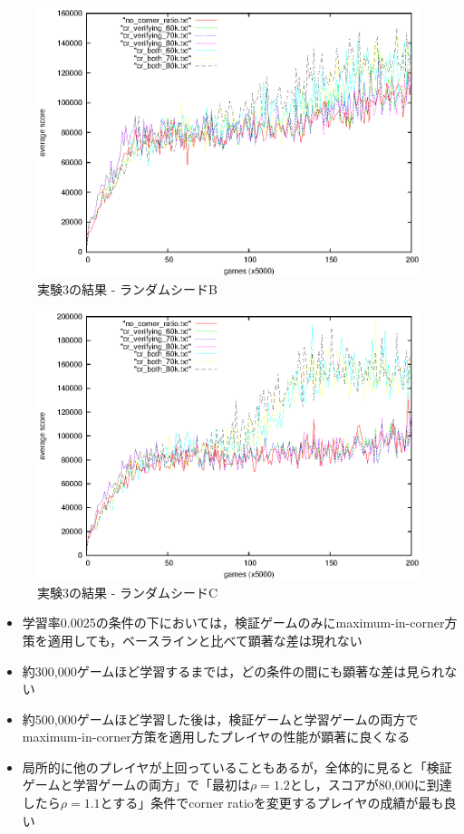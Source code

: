 \documentclass{suribt}
\begin{document}
\begin{figure}[tb]
	\begin{center}
	\includegraphics[width=13cm]{figure_012.eps}
	\caption{実験3の結果 - ランダムシードB}
	\label{figure_012}
	\end{center}
\end{figure}

\begin{figure}[tb]
	\begin{center}
	\includegraphics[width=13cm]{figure_013.eps}
	\caption{実験3の結果 - ランダムシードC}
	\label{figure_013}
	\end{center}
\end{figure}

\begin{itemize}
\item 学習率0.0025の条件の下においては，検証ゲームのみにmaximum-in-corner方策を適用しても，ベースラインと比べて顕著な差は現れない
\item 約300,000ゲームほど学習するまでは，どの条件の間にも顕著な差は見られない
\item 約500,000ゲームほど学習した後は，検証ゲームと学習ゲームの両方でmaximum-in-corner方策を適用したプレイヤの性能が顕著に良くなる
\item 局所的に他のプレイヤが上回っていることもあるが，全体的に見ると「検証ゲームと学習ゲームの両方」で「最初は${\rho}=1.2$とし，スコアが80,000に到達したら${\rho}=1.1$とする」条件でcorner ratioを変更するプレイヤの成績が最も良い
\end{itemize}
\end{document}
